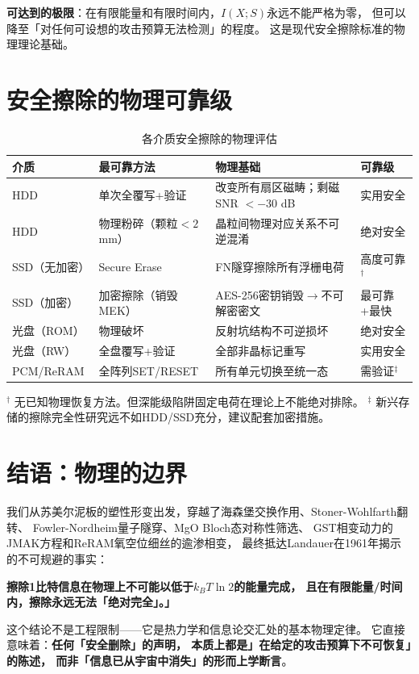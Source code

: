 \documentclass[11pt,a4paper,openany]{book}
\theoremstyle{definition}
\theoremstyle{plain}
\theoremstyle{remark}
\begin{document}
\textbf{可达到的极限}：在有限能量和有限时间内，$I(X;S)$永远不能严格为零，
但可以降至「对任何可设想的攻击预算无法检测」的程度。
这是现代安全擦除标准的物理理论基础。

\section{安全擦除的物理可靠级}

\begin{table}[H]
\centering
\caption{各介质安全擦除的物理评估}
\begin{tabular}{@{}p{2.5cm}p{4.5cm}p{5cm}p{2.5cm}@{}}
\toprule
介质 & 最可靠方法 & 物理基础 & 可靠级 \\
\midrule
HDD & 单次全覆写+验证 & 改变所有扇区磁畴；剩磁SNR $< -30$ dB & 实用安全 \\
HDD & 物理粉碎（颗粒$< 2$ mm） & 晶粒间物理对应关系不可逆混淆 & 绝对安全 \\
SSD（无加密）& Secure Erase & FN隧穿擦除所有浮栅电荷 & 高度可靠$^\dagger$ \\
SSD（加密） & 加密擦除（销毁MEK） & AES-256密钥销毁$\to$不可解密密文 & 最可靠+最快 \\
光盘（ROM） & 物理破坏 & 反射坑结构不可逆损坏 & 绝对安全 \\
光盘（RW） & 全盘覆写+验证 & 全部非晶标记重写 & 实用安全 \\
PCM/ReRAM & 全阵列SET/RESET & 所有单元切换至统一态 & 需验证$^\ddagger$ \\
\bottomrule
\end{tabular}

\vspace{4pt}
{\footnotesize
$^\dagger$ 无已知物理恢复方法。但深能级陷阱固定电荷在理论上不能绝对排除。
$^\ddagger$ 新兴存储的擦除完全性研究远不如HDD/SSD充分，建议配套加密措施。}
\end{table}

\section{结语：物理的边界}

我们从苏美尔泥板的塑性形变出发，穿越了海森堡交换作用、Stoner-Wohlfarth翻转、
Fowler-Nordheim量子隧穿、MgO Bloch态对称性筛选、
GST相变动力的JMAK方程和ReRAM氧空位细丝的逾渗相变，
最终抵达Landauer在1961年揭示的不可规避的事实：

\textbf{擦除1比特信息在物理上不可能以低于$k_B T\ln 2$的能量完成，
且在有限能量/时间内，擦除永远无法「绝对完全」。」}

这个结论不是工程限制——它是热力学和信息论交汇处的基本物理定律。
它直接意味着：\textbf{任何「安全删除」的声明，
本质上都是」在给定的攻击预算下不可恢复」的陈述，
而非「信息已从宇宙中消失」的形而上学断言}。
\end{document}
